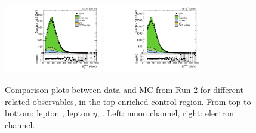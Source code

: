 \begin{figure}[htbp]
  \includegraphics[width=0.3825\textwidth]{fig/controlPlots/CR_b1_mu_allP_allC_allD_Run2_met_pt.pdf}
  \includegraphics[width=0.3825\textwidth]{fig/controlPlots/CR_b1_e_allP_allC_allD_Run2_met_pt.pdf}\\
  \caption{
    Comparison plots between data and MC from Run 2 for different \Wlep-related observables, in the top-enriched control region.
    From top to bottom: lepton \pt, lepton $\eta$, \Etmiss.
    Left: muon channel, right: electron channel.
  }
  \label{fig:CR_controlPlotsRun2_1}
\end{figure}

